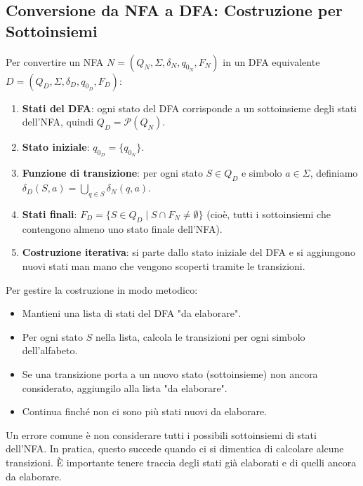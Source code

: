 \documentclass[12pt,a4paper]{article}
\newcommand{\powerset}{\mathcal{P}}
\begin{document}
\subsection{Conversione da NFA a DFA: Costruzione per Sottoinsiemi}

\begin{risoluzione}
Per convertire un NFA $N = (Q_N, \Sigma, \delta_N, q_{0_N}, F_N)$ in un DFA equivalente $D = (Q_D, \Sigma, \delta_D, q_{0_D}, F_D)$:

\begin{enumerate}
  \item \textbf{Stati del DFA}: ogni stato del DFA corrisponde a un sottoinsieme degli stati dell'NFA, quindi $Q_D = \powerset(Q_N)$.
  \item \textbf{Stato iniziale}: $q_{0_D} = \{q_{0_N}\}$.
  \item \textbf{Funzione di transizione}: per ogni stato $S \in Q_D$ e simbolo $a \in \Sigma$, definiamo $\delta_D(S, a) = \bigcup_{q \in S} \delta_N(q, a)$.
  \item \textbf{Stati finali}: $F_D = \{S \in Q_D \mid S \cap F_N \neq \emptyset\}$ (cioè, tutti i sottoinsiemi che contengono almeno uno stato finale dell'NFA).
  \item \textbf{Costruzione iterativa}: si parte dallo stato iniziale del DFA e si aggiungono nuovi stati man mano che vengono scoperti tramite le transizioni.
\end{enumerate}
\end{risoluzione}

\begin{suggerimento}
Per gestire la costruzione in modo metodico:
\begin{itemize}
  \item Mantieni una lista di stati del DFA "da elaborare".
  \item Per ogni stato $S$ nella lista, calcola le transizioni per ogni simbolo dell'alfabeto.
  \item Se una transizione porta a un nuovo stato (sottoinsieme) non ancora considerato, aggiungilo alla lista "da elaborare".
  \item Continua finché non ci sono più stati nuovi da elaborare.
\end{itemize}
\end{suggerimento}

\begin{errorecomune}
Un errore comune è non considerare tutti i possibili sottoinsiemi di stati dell'NFA. In pratica, questo succede quando ci si dimentica di calcolare alcune transizioni. È importante tenere traccia degli stati già elaborati e di quelli ancora da elaborare.
\end{errorecomune}
\end{document}
